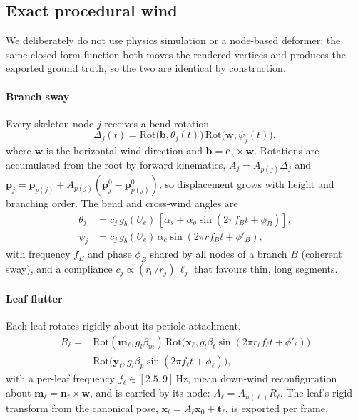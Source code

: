 \documentclass[preprint,11pt,authoryear]{elsarticle}
\begin{document}
\subsection{Exact procedural wind}
We deliberately do not use physics simulation or a node-based deformer: the same closed-form function both moves the rendered vertices and produces the exported ground truth, so the two are identical by construction.

\paragraph{Branch sway} Every skeleton node $j$ receives a bend rotation
\begin{equation}
\Delta_j(t) = \mathrm{Rot}\big(\mathbf b, \theta_j(t)\big)\,\mathrm{Rot}\big(\mathbf w, \psi_j(t)\big),
\end{equation}
where $\mathbf w$ is the horizontal wind direction and $\mathbf b = \mathbf e_z \times \mathbf w$. Rotations are accumulated from the root by forward kinematics, $A_j = A_{p(j)}\Delta_j$ and $\mathbf p_j = \mathbf p_{p(j)} + A_{p(j)}(\mathbf p_j^0 - \mathbf p_{p(j)}^0)$, so displacement grows with height and branching order. The bend and cross-wind angles are
\begin{align}
\theta_j &= c_j\, g_b(U_e)\,[\alpha_s + \alpha_o \sin(2\pi f_{B}t + \phi_{B})], \\
\psi_j &= c_j\, g_b(U_e)\,\alpha_c \sin(2\pi r f_{B} t + \phi'_{B}),
\end{align}
with frequency $f_B$ and phase $\phi_B$ shared by all nodes of a branch $B$ (coherent sway), and a compliance $c_j \propto (r_0/r_j)\,\ell_j$ that favours thin, long segments.

\paragraph{Leaf flutter} Each leaf rotates rigidly about its petiole attachment,
\begin{equation}
\begin{split}
R_\ell = {}& \mathrm{Rot}(\mathbf m_\ell, g_l\beta_m)\,\mathrm{Rot}\big(\mathbf x_\ell, g_l\beta_t \sin(2\pi r_\ell f_\ell t + \phi'_\ell)\big) \\
& \mathrm{Rot}\big(\mathbf y_\ell, g_l\beta_p\sin(2\pi f_\ell t + \phi_\ell)\big),
\end{split}
\end{equation}
with a per-leaf frequency $f_\ell\in[2.5, 9]$\,Hz, mean down-wind reconfiguration about $\mathbf m_\ell = \mathbf n_\ell \times \mathbf w$, and is carried by its node: $A_\ell = A_{n(\ell)}R_\ell$. The leaf's rigid transform from the canonical pose, $\mathbf x_t = A_\ell \mathbf x_0 + \mathbf t_\ell$, is exported per frame.
\end{document}
